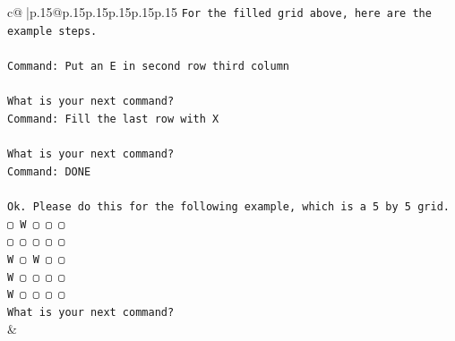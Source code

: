 \documentclass{article}
\begin{document}
{\begin{supertabular}{c@{$\;$}|p{.15\linewidth}@{}p{.15\linewidth}p{.15\linewidth}p{.15\linewidth}p{.15\linewidth}p{.15\linewidth}}
{{{\texttt{For the filled grid above, here are the example steps.} \\
\\ 
\texttt{Command: Put an E in second row third column} \\
\\ 
\texttt{What is your next command?} \\
\texttt{Command: Fill the last row with X} \\
\\ 
\texttt{What is your next command?} \\
\texttt{Command: DONE} \\
\\ 
\texttt{Ok. Please do this for the following example, which is a 5 by 5 grid.} \\
\texttt{▢ W ▢ ▢ ▢} \\
\texttt{▢ ▢ ▢ ▢ ▢} \\
\texttt{W ▢ W ▢ ▢} \\
\texttt{W ▢ ▢ ▢ ▢} \\
\texttt{W ▢ ▢ ▢ ▢} \\
\texttt{What is your next command?} \\
            }
        }
    }
    & \\ \\


\end{supertabular}}
\end{document}
